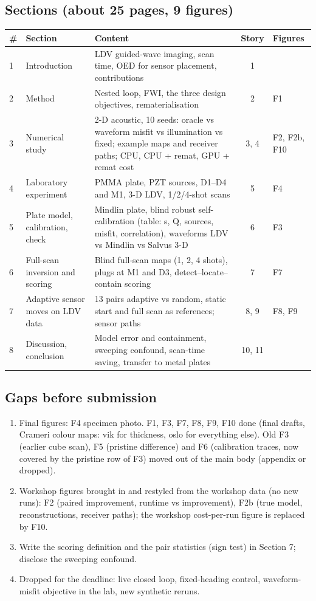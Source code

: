 \documentclass[10pt]{article}
\begin{document}
\subsection*{Sections (about 25 pages, 9 figures)}
\small
\begin{tabularx}{\linewidth}{@{}l l X c l@{}}
\toprule
\# & Section & Content & Story & Figures\\ \midrule
1 & Introduction & LDV guided-wave imaging, scan time, OED for sensor placement, contributions & 1 & \\
2 & Method & Nested loop, FWI, the three design objectives, rematerialisation & 2 & F1\\
3 & Numerical study & 2-D acoustic, 10 seeds: oracle vs waveform misfit vs illumination vs fixed; example maps and receiver paths; CPU, CPU + remat, GPU + remat cost & 3, 4 & F2, F2b, F10\\
4 & Laboratory experiment & PMMA plate, PZT sources, D1--D4 and M1, 3-D LDV, 1/2/4-shot scans & 5 & F4\\
5 & Plate model, calibration, check & Mindlin plate, blind robust self-calibration (table: s, Q, sources, misfit, correlation), waveforms LDV vs Mindlin vs Salvus 3-D & 6 & F3\\
6 & Full-scan inversion and scoring & Blind full-scan maps (1, 2, 4 shots), plugs at M1 and D3, detect--locate--contain scoring & 7 & F7\\
7 & Adaptive sensor moves on LDV data & 13 pairs adaptive vs random, static start and full scan as references; sensor paths & 8, 9 & F8, F9\\
8 & Discussion, conclusion & Model error and containment, sweeping confound, scan-time saving, transfer to metal plates & 10, 11 & \\
\bottomrule
\end{tabularx}
\normalsize

\subsection*{Gaps before submission}
\begin{enumerate}
\item Final figures: F4 specimen photo. F1, F3, F7, F8, F9, F10 done (final drafts, Crameri colour maps: vik for thickness, oslo for everything else). Old F3 (earlier cube scan), F5 (pristine difference) and F6 (calibration traces, now covered by the pristine row of F3) moved out of the main body (appendix or dropped).
\item Workshop figures brought in and restyled from the workshop data (no new runs): F2 (paired improvement, runtime vs improvement), F2b (true model, reconstructions, receiver paths); the workshop cost-per-run figure is replaced by F10.
\item Write the scoring definition and the pair statistics (sign test) in Section 7; disclose the sweeping confound.
\item Dropped for the deadline: live closed loop, fixed-heading control, waveform-misfit objective in the lab, new synthetic reruns.
\end{enumerate}
\end{document}
